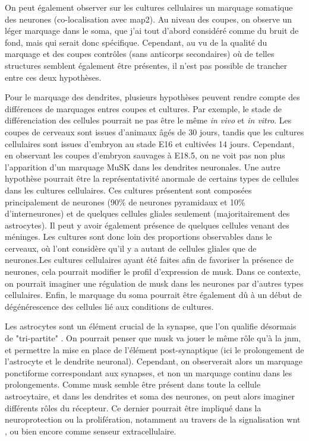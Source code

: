 On peut également observer sur les cultures cellulaires un marquage somatique des neurones (co-localisation avec \gls{map2}). Au niveau des coupes, on observe un léger marquage dans le soma, que j'ai tout d'abord considéré comme du bruit de fond, mais qui serait donc spécifique. Cependant, au vu de la qualité du marquage et des coupes contrôles (sans anticorps secondaires) où de telles structures semblent également être présentes, il n'est pas possible de trancher entre ces deux hypothèses.

Pour le marquage des dendrites, plusieurs hypothèses peuvent rendre compte des différences de marquages entres coupes et cultures. Par exemple, le stade de différenciation des cellules pourrait ne pas être le même \emph{in vivo} et \emph{in vitro}. Les coupes de cerveaux sont issues d'animaux âgés de 30 jours, tandis que les cultures cellulaires sont issues d'embryon au stade E16 et cultivées 14 jours. Cependant, en observant les coupes d’embryon sauvages à E18.5, on ne voit pas non plus l’apparition d’un marquage MuSK dans les dendrites neuronales. Une autre hypothèse pourrait être la représentativité anormale de certains types de cellules dans les cultures cellulaires. Ces cultures présentent sont composées principalement de neurones (90\% de neurones pyramidaux et 10\% d'interneurones) et de quelques cellules gliales seulement (majoritairement des astrocytes). Il peut y avoir également présence de quelques cellules venant des méninges. Les cultures sont donc loin des proportions observables dans le cerveaux, où l'ont considère qu'il y a autant de cellules gliales que de neurones.Les cultures cellulaires ayant été faites afin de favoriser la présence de neurones, cela pourrait modifier le profil d'expression de \gls{musk}. Dans ce contexte, on pourrait imaginer une régulation de \gls{musk} dans les neurones par d'autres types cellulaires. Enfin, le marquage du soma pourrait être également dû à un début de dégénérescence des cellules lié aux conditions de cultures.

Les astrocytes sont un élément crucial de la synapse, que l'on qualifie désormais de "tri-partite" \cite{Araque1999, Perea2009}. On pourrait penser que \gls{musk} va jouer le même rôle qu'à la \gls{jnm}, et permettre la mise en place de l'élément post-synaptique (ici le prolongement de l'astrocyte et le dendrite neuronal). Cependant, on observerait alors un marquage ponctiforme correspondant aux synapses, et non un marquage continu dans les prolongements. Comme \gls{musk} semble être présent dans toute la cellule astrocytaire, et dans les dendrites et soma des neurones, on peut alors imaginer différents rôles du récepteur. Ce dernier pourrait être impliqué dans la neuroprotection ou la prolifération, notamment au travers de la signalisation \Gls{wnt} \cite{Toledo2008, Cerpa2009}, ou bien encore comme senseur extracellulaire.

